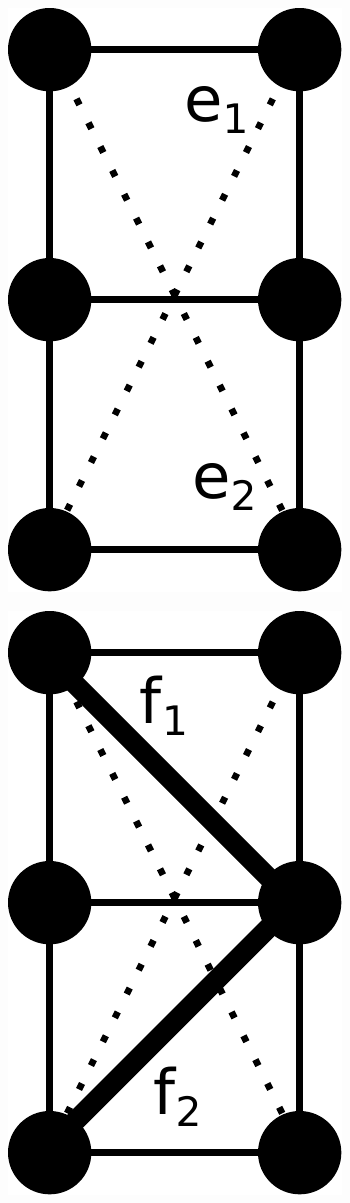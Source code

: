 \begin{figure}
\begin{subfigure}{.08\linewidth}
        \includegraphics[height=\myMinHeight]{../../img/svg/k33_omd_b}
        \caption{}\label{fig:omd_k33_example:b}
    \end{subfigure}\hspace{1cm}
    \begin{subfigure}{.08\linewidth}\centering
        \includegraphics[height=\myMinHeight]{../../img/svg/k33_omd_c}

\end{subfigure}
\end{figure}
